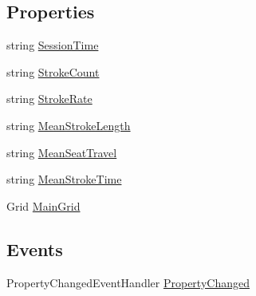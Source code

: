 \subsection*{Properties}
\begin{DoxyCompactItemize}
\item 
string \hyperlink{class_rowing_monitor_1_1_view_model_1_1_trainee_view_model_aeb6c056cdfa3855f42ae5954ea11f20d}{Session\+Time}
\item 
string \hyperlink{class_rowing_monitor_1_1_view_model_1_1_trainee_view_model_a931c2a2c640cf7d42cfb29d1e21049af}{Stroke\+Count}
\item 
string \hyperlink{class_rowing_monitor_1_1_view_model_1_1_trainee_view_model_ac4d37599e83e9a8a79f4f101d61c1223}{Stroke\+Rate}
\item 
string \hyperlink{class_rowing_monitor_1_1_view_model_1_1_trainee_view_model_abeea8b0717e76fcb5bb300ba96f50b2b}{Mean\+Stroke\+Length}
\item 
string \hyperlink{class_rowing_monitor_1_1_view_model_1_1_trainee_view_model_a3528ab6aaf531da1b58fbcb841bf6289}{Mean\+Seat\+Travel}
\item 
string \hyperlink{class_rowing_monitor_1_1_view_model_1_1_trainee_view_model_a3b991710dd1abe5a0292242d84b751bb}{Mean\+Stroke\+Time}
\item 
Grid \hyperlink{class_rowing_monitor_1_1_view_model_1_1_trainee_view_model_a4fab1e779e1336f06f79849e2128459d}{Main\+Grid}
\end{DoxyCompactItemize}
\subsection*{Events}
\begin{DoxyCompactItemize}
\item 
Property\+Changed\+Event\+Handler \hyperlink{class_rowing_monitor_1_1_view_model_1_1_trainee_view_model_a33d6d8137f217e3c51d97e8f6b871ab8}{Property\+Changed}
\end{DoxyCompactItemize}


